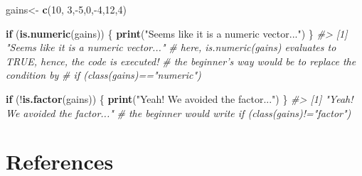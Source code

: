 \documentclass[]{book}
\newenvironment{Shaded}{}{}
\newcommand{\CommentTok}[1]{\textcolor[rgb]{0.38,0.63,0.69}{\textit{#1}}}
\newcommand{\ControlFlowTok}[1]{\textcolor[rgb]{0.00,0.44,0.13}{\textbf{#1}}}
\newcommand{\DecValTok}[1]{\textcolor[rgb]{0.25,0.63,0.44}{#1}}
\newcommand{\KeywordTok}[1]{\textcolor[rgb]{0.00,0.44,0.13}{\textbf{#1}}}
\newcommand{\NormalTok}[1]{#1}
\newcommand{\OperatorTok}[1]{\textcolor[rgb]{0.40,0.40,0.40}{#1}}
\newcommand{\StringTok}[1]{\textcolor[rgb]{0.25,0.44,0.63}{#1}}
\theoremstyle{definition}
\theoremstyle{definition}
\theoremstyle{definition}
\theoremstyle{remark}
\begin{document}
\begin{Shaded}
\begin{Highlighting}[]
\NormalTok{gains<-}\StringTok{ }\KeywordTok{c}\NormalTok{(}\DecValTok{10}\NormalTok{, }\DecValTok{3}\NormalTok{,}\OperatorTok{-}\DecValTok{5}\NormalTok{,}\DecValTok{0}\NormalTok{,}\OperatorTok{-}\DecValTok{4}\NormalTok{,}\DecValTok{12}\NormalTok{,}\DecValTok{4}\NormalTok{)}

\ControlFlowTok{if}\NormalTok{ (}\KeywordTok{is.numeric}\NormalTok{(gains)) \{}
  \KeywordTok{print}\NormalTok{(}\StringTok{"Seems like it is a numeric vector..."}\NormalTok{)}
\NormalTok{\}}
\CommentTok{#> [1] "Seems like it is a numeric vector..."}
\CommentTok{# here, is.numeric(gains) evaluates to TRUE, hence, the code is executed!}
\CommentTok{# the beginner's way would be to replace the condition by}
\CommentTok{# if (class(gains)=="numeric")}

\ControlFlowTok{if}\NormalTok{ (}\OperatorTok{!}\KeywordTok{is.factor}\NormalTok{(gains)) \{}
  \KeywordTok{print}\NormalTok{(}\StringTok{"Yeah! We avoided the factor..."}\NormalTok{)}
\NormalTok{\}}
\CommentTok{#> [1] "Yeah! We avoided the factor..."}
\CommentTok{# the beginner would write if (class(gains)!="factor")}
\end{Highlighting}
\end{Shaded}

\hypertarget{references}{%
\chapter*{References}\label{references}}


\end{document}
